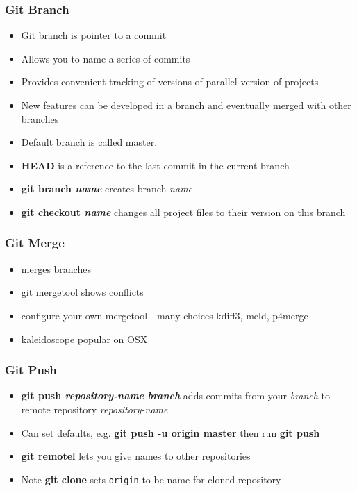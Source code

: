 \begin{frame}
\frametitle{Git Branch}

\begin{itemize}
\item Git branch is pointer to a commit

\item Allows you to name a series of commits

\item Provides convenient tracking of versions of parallel version of projects

\item New features can be developed in a branch and eventually merged with other branches

\item Default branch is called master. 

\item {\bf HEAD} is a reference to the last commit in the current branch

\item  {\bf git branch {\it name}} creates branch {\it name}

\item  {\bf git checkout {\it name}} changes all project files to their version on this branch
\end{itemize}
\end{frame}

\begin{frame}
\frametitle{Git Merge}

\begin{itemize}
\item merges branches
\item git mergetool shows conflicts
\item configure your own mergetool - many choices kdiff3, meld, p4merge
\item kaleidoscope popular on OSX 
\end{itemize}

\end{frame}

\begin{frame}
\frametitle{Git Push}

\begin{itemize}
\item {\bf git push {\it repository-name} {\it branch}} adds commits from your {\it branch} to remote repository {\it repository-name} 

\item Can set defaults, e.g. {\bf git push -u origin master} then run {\bf git push}

\item {\bf git remotel} lets you give names to other repositories

\item Note {\bf git clone} sets {\tt origin} to be name for cloned repository
\end{itemize}
\end{frame}

